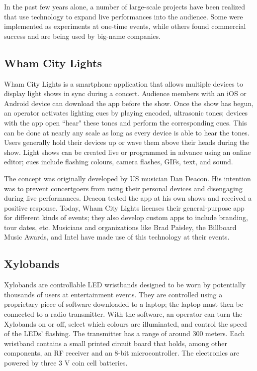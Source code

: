 In the past few years alone, a number of large-scale projects have been realized that use technology to expand live performances into the audience. Some were implemented as experiments at one-time events, while others found commercial success and are being used by big-name companies.

\subsection{Wham City Lights}

Wham City Lights is a smartphone application that allows multiple devices to display light shows in sync during a concert. Audience members with an iOS or Android device can download the app before the show. Once the show has begun, an operator activates lighting cues by playing encoded, ultrasonic tones; devices with the app open ``hear" these tones and perform the corresponding cues. This can be done at nearly any scale as long as every device is able to hear the tones. Users generally hold their devices up or wave them above their heads during the show. Light shows can be created live or programmed in advance using an online editor; cues include flashing colours, camera flashes, GIFs, text, and sound.

The concept was originally developed by US musician Dan Deacon. His intention was to prevent concertgoers from using their personal devices and disengaging during live performances. Deacon tested the app at his own shows and received a positive response. Today, Wham City Lights licenses their general-purpose app for different kinds of events; they also develop custom apps to include branding, tour dates, etc. Musicians and organizations like Brad Paisley, the Billboard Music Awards, and Intel have made use of this technology at their events.

\subsection{Xylobands}

Xylobands are controllable LED wristbands designed to be worn by potentially thousands of users at entertainment events. They are controlled using a proprietary piece of software downloaded to a laptop; the laptop must then be connected to a radio transmitter. With the software, an operator can turn the Xylobands on or off, select which colours are illuminated, and control the speed of the LEDs' flashing. The transmitter has a range of around 300 meters. Each wristband contains a small printed circuit board that holds, among other components, an RF receiver and an 8-bit microcontroller. The electronics are powered by three 3 V coin cell batteries.

